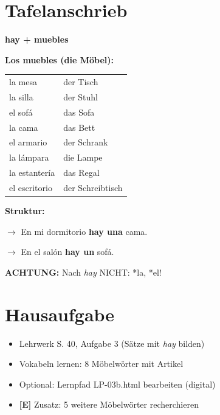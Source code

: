 \documentclass[11pt,a4paper]{article}
\newcommand{\E}{\textcolor{erweiterung}{\textbf{[E]}}}
\begin{document}
\section{Tafelanschrieb}

\begin{infobox}[Tafelanschrieb]
\textbf{\Large hay + muebles}

\vspace{1em}

\textbf{Los muebles (die Möbel):}

\begin{tabular}{ll}
la mesa & der Tisch \\
la silla & der Stuhl \\
el sofá & das Sofa \\
la cama & das Bett \\
el armario & der Schrank \\
la lámpara & die Lampe \\
la estantería & das Regal \\
el escritorio & der Schreibtisch \\
\end{tabular}

\vspace{1em}

\textbf{Struktur:}


\vspace{0.5em}

$\rightarrow$ En mi dormitorio \textbf{hay una} cama.

$\rightarrow$ En el salón \textbf{hay un} sofá.

\vspace{1em}

\textbf{ACHTUNG:} Nach \textit{hay} NICHT: *la, *el!
\end{infobox}

\section{Hausaufgabe}

\begin{itemize}
    \item Lehrwerk S. 40, Aufgabe 3 (Sätze mit \textit{hay} bilden)
    \item Vokabeln lernen: 8 Möbelwörter mit Artikel
    \item Optional: Lernpfad LP-03b.html bearbeiten (digital)
    \item \E{} Zusatz: 5 weitere Möbelwörter recherchieren
\end{itemize}
\end{document}
